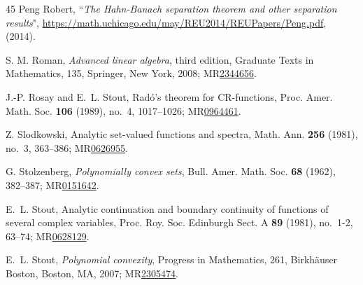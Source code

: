\documentclass[12pt,reqno, a4paper]{amsart}
\theoremstyle{definition}
\theoremstyle{definition}
\numberwithin{equation}{section}
\begin{document}
\begin{thebibliography}{45}
 Peng Robert, ``\textit{The Hahn-Banach separation theorem and other separation results}", \href{https://math.uchicago.edu/~may/REU2014/REUPapers/Peng.pdf}{https://math.uchicago.edu/may/REU2014/REUPapers/Peng.pdf}, (2014).

 S. M. Roman, {\it Advanced linear algebra}, third edition, Graduate Texts in Mathematics, 135, Springer, New York, 2008; MR\href{https://mathscinet.ams.org/mathscinet/article?mr=2344656}{2344656}.


 J.-P. Rosay and E.~L. Stout, Rad\'o's theorem for CR-functions, Proc. Amer. Math. Soc. {\bf 106} (1989), no.~4, 1017--1026; MR\href{https://mathscinet.ams.org/mathscinet/article?mr=964461}{0964461}.

		
	Z. Slodkowski, Analytic set-valued functions and spectra, Math. Ann. {\bf 256} (1981), no.~3, 363--386; MR\href{https://mathscinet.ams.org/mathscinet/article?mr=626955}{0626955}.


 G. Stolzenberg, \textit{Polynomially convex sets}, Bull. Amer. Math. Soc. {\bf 68} (1962), 382--387; MR\href{https://mathscinet.ams.org/mathscinet/article?mr=151642}{0151642}.

  E.~L. Stout, Analytic continuation and boundary continuity of functions of several complex variables, Proc. Roy. Soc. Edinburgh Sect. A {\bf 89} (1981), no.~1-2, 63--74; MR\href{https://mathscinet.ams.org/mathscinet/article?mr=628129}{0628129}.
	
 E.~L. Stout, {\it Polynomial convexity}, Progress in Mathematics, 261, Birkh\"auser Boston, Boston, MA, 2007; MR\href{https://mathscinet.ams.org/mathscinet/article?mr=2305474}{2305474}.


\vspace{.5cm}
\end{thebibliography}	
	
	
	
	
	
	
	
	
\end{document}
